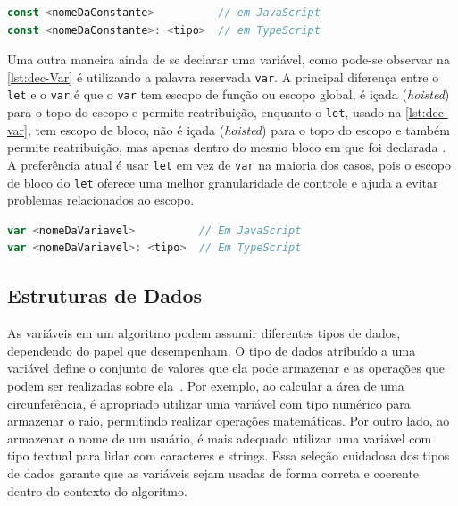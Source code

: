 \begin{lstlisting}[language=TypeScript, label=lst:dec-const , caption=Sintaxe Generalizada de Declaração de Constante em JS e TS.]
const <nomeDaConstante>          // em JavaScript
const <nomeDaConstante>: <tipo>  // em TypeScript
\end{lstlisting}

Uma outra maneira ainda de se declarar uma variável, como pode-se observar na \autoref{lst:dec-Var} é utilizando a palavra reservada \texttt{var}. A principal diferença entre o \texttt{let} e o \texttt{var} é que o \texttt{var} tem escopo de função ou escopo global, é içada (\textit{hoisted}) para o topo do escopo e permite reatribuição, enquanto o \texttt{let}, usado na \autoref{lst:dec-var}, tem escopo de bloco, não é içada (\textit{hoisted}) para o topo do escopo e também permite reatribuição, mas apenas dentro do mesmo bloco em que foi declarada \cite{statement-var, statement-let}. A preferência atual é usar \texttt{let} em vez de \texttt{var} na maioria dos casos, pois o escopo de bloco do \texttt{let} oferece uma melhor granularidade de controle e ajuda a evitar problemas relacionados ao escopo.

\begin{lstlisting}[language=TypeScript, caption=Sintaxe Generalizada de Declaração de Variável Global em JS., label=lst:dec-Var]
var <nomeDaVariavel>          // Em JavaScript
var <nomeDaVariavel>: <tipo>  // Em TypeScript
\end{lstlisting}

\subsection{Estruturas de Dados}

As variáveis em um algoritmo podem assumir diferentes tipos de dados, dependendo do papel que desempenham. O tipo de dados atribuído a uma variável define o conjunto de valores que ela pode armazenar e as operações que podem ser realizadas sobre ela~\cite{wikipedia_tipodedado}. Por exemplo, ao calcular a área de uma circunferência, é apropriado utilizar uma variável com tipo numérico para armazenar o raio, permitindo realizar operações matemáticas. Por outro lado, ao armazenar o nome de um usuário, é mais adequado utilizar uma variável com tipo textual para lidar com caracteres e strings. Essa seleção cuidadosa dos tipos de dados garante que as variáveis sejam usadas de forma correta e coerente dentro do contexto do algoritmo.

